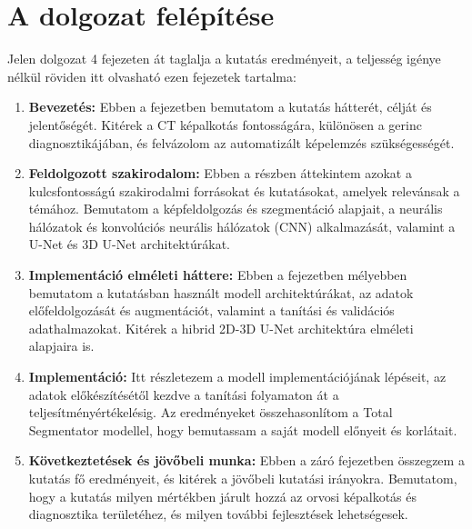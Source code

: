 \section{A dolgozat felépítése}  %
Jelen dolgozat 4 fejezeten át taglalja a kutatás eredményeit, a teljesség igénye nélkül röviden itt olvasható ezen fejezetek tartalma:
\begin{enumerate}
	\item \textbf{Bevezetés:} Ebben a fejezetben bemutatom a kutatás hátterét, célját és jelentőségét. Kitérek a CT képalkotás fontosságára, különösen a gerinc diagnosztikájában, és felvázolom az automatizált képelemzés szükségességét.
	
	\item \textbf{Feldolgozott szakirodalom:} Ebben a részben áttekintem azokat a kulcsfontosságú szakirodalmi forrásokat és kutatásokat, amelyek relevánsak a témához. Bemutatom a képfeldolgozás és szegmentáció alapjait, a neurális hálózatok és konvolúciós neurális hálózatok (CNN) alkalmazását, valamint a U-Net és 3D U-Net architektúrákat.
	
	\item \textbf{Implementáció elméleti háttere:} Ebben a fejezetben mélyebben bemutatom a kutatásban használt modell architektúrákat, az adatok előfeldolgozását és augmentációt, valamint a tanítási és validációs adathalmazokat. Kitérek a hibrid 2D-3D U-Net architektúra elméleti alapjaira is.
	
	\item \textbf{Implementáció:} Itt részletezem a modell implementációjának lépéseit, az adatok előkészítésétől kezdve a tanítási folyamaton át a teljesítményértékelésig. Az eredményeket összehasonlítom a Total Segmentator modellel, hogy bemutassam a saját modell előnyeit és korlátait.
	
	\item \textbf{Következtetések és jövőbeli munka:} Ebben a záró fejezetben összegzem a kutatás fő eredményeit, és kitérek a jövőbeli kutatási irányokra. Bemutatom, hogy a kutatás milyen mértékben járult hozzá az orvosi képalkotás és diagnosztika területéhez, és milyen további fejlesztések lehetségesek.
\end{enumerate}